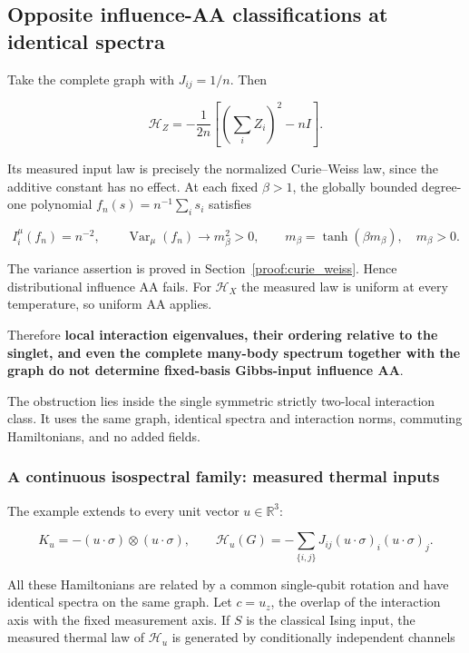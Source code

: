 \subsection{Opposite influence-AA classifications at identical
spectra}\label{quant:sec-3}

Take the complete graph with \(J_{ij}=1/n\). Then

\[
\mathcal H_Z=-\frac1{2n}\left[\left(\sum_iZ_i\right)^2-nI\right].
\]

Its measured input law is precisely the normalized Curie--Weiss law,
since the additive constant has no effect. At each fixed \(\beta>1\),
the globally bounded degree-one polynomial \(f_n(s)=n^{-1}\sum_i s_i\)
satisfies

\[
I_i^\mu(f_n)=n^{-2},\qquad
\operatorname{Var}_\mu(f_n)\longrightarrow m_\beta^2>0,
\qquad m_\beta=\tanh(\beta m_\beta),\quad m_\beta>0.
\]

The variance assertion is proved in
Section~\ref{proof:curie_weiss}. Hence distributional influence AA
fails. For \(\mathcal H_X\) the measured law is uniform at every
temperature, so uniform AA applies.

Therefore \textbf{local interaction eigenvalues, their ordering relative
to the singlet, and even the complete many-body spectrum together with
the graph do not determine fixed-basis Gibbs-input influence AA}.

The obstruction lies inside the single symmetric strictly two-local
interaction class. It uses the same graph, identical spectra and
interaction norms, commuting Hamiltonians, and no added fields.

\subsubsection{A continuous isospectral family: measured thermal
inputs}\label{quant:heading-5}

The example extends to every unit vector \(u\in\mathbb R^3\):

\[
K_u=-(u\cdot\sigma)\otimes(u\cdot\sigma),\qquad
\mathcal H_u(G)=-\sum_{\{i,j\}}J_{ij}(u\cdot\sigma)_i(u\cdot\sigma)_j.
\]

All these Hamiltonians are related by a common single-qubit rotation and
have identical spectra on the same graph. Let \(c=u_z\), the overlap of
the interaction axis with the fixed measurement axis. If \(S\) is the
classical Ising input, the measured thermal law of \(\mathcal H_u\) is
generated by conditionally independent channels

